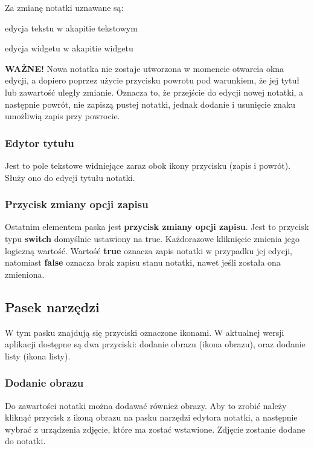 Za zmianę notatki uznawane są:

\begin{compactitem}
    \item edycja tekstu w akapitie tekstowym
    \item edycja widgetu w akapitie widgetu
\end{compactitem}
\vspace{5mm}

\textbf{WAŻNE!} Nowa notatka nie zostaje utworzona w momencie otwarcia okna edycji, a dopiero poprzez użycie przycisku powrotu pod warunkiem, że jej tytuł lub zawartość uległy zmianie. Oznacza to, że przejście do edycji nowej notatki, a następnie powrót, nie zapiszą pustej notatki, jednak dodanie i usunięcie znaku umożliwią zapis przy powrocie.

\subsubsection{Edytor tytułu}

Jest to pole tekstowe widniejące zaraz obok ikony przycisku (zapis i powrót). Służy ono do edycji tytułu notatki.

\subsubsection{Przycisk zmiany opcji zapisu}

Ostatnim elementem paska jest \textbf{przycisk zmiany opcji zapisu}. Jest to przycisk typu \textbf{switch} domyślnie ustawiony na true. Każdorazowe kliknięcie zmienia jego logiczną wartość.
Wartość \textbf{true} oznacza zapis notatki w przypadku jej edycji, natomiast \textbf{false} oznacza brak zapisu stanu notatki, nawet jeśli została ona zmieniona.

\subsection{Pasek narzędzi}

W tym pasku znajdują się przyciski oznaczone ikonami.
W aktualnej wersji aplikacji dostępne są dwa przyciski: dodanie obrazu (ikona obrazu), oraz dodanie listy (ikona listy).

\subsubsection{Dodanie obrazu}

Do zawartości notatki można dodawać również obrazy. Aby to zrobić należy kliknąć przycisk z ikoną obrazu na pasku narzędzi edytora notatki, a następnie wybrać z urządzenia zdjęcie, które ma zostać wstawione. Zdjęcie zostanie dodane do notatki.

